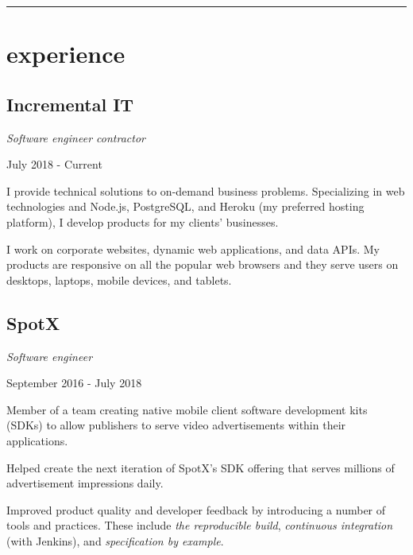 \setlength{\parindent}{0cm}
\setlength{\parskip}{0.5em}

\begin{samepage}
  \hrule
  \section*{experience}
\end{samepage}

\subsection*{Incremental IT}
\noindent\begin{minipage}[b]{0.5\textwidth}
  \flushleft
  \emph{Software engineer contractor}
\end{minipage}
\noindent\begin{minipage}[b]{0.5\textwidth}
  \flushright
  July 2018 - Current
\end{minipage}

I provide technical solutions to on-demand business problems. Specializing in
web technologies and Node.js, PostgreSQL, and Heroku (my preferred hosting
platform), I develop products for my clients' businesses.

I work on corporate websites, dynamic web applications, and data APIs. My
products are responsive on all the popular web browsers and they serve users
on desktops, laptops, mobile devices, and tablets.

\subsection*{SpotX}
\noindent\begin{minipage}[b]{0.5\textwidth}
  \flushleft
  \emph{Software engineer}
\end{minipage}
\noindent\begin{minipage}[b]{0.5\textwidth}
  \flushright
  September 2016 - July 2018
\end{minipage}

Member of a team creating native mobile client software development kits (SDKs)
to allow publishers to serve video advertisements within their applications.

Helped create the next iteration of SpotX's SDK offering that serves millions of
advertisement impressions daily.

Improved product quality and developer feedback by introducing a number of tools
and practices. These include \emph{the reproducible build}, \emph{continuous
  integration} (with Jenkins), and \emph{specification by example}.

